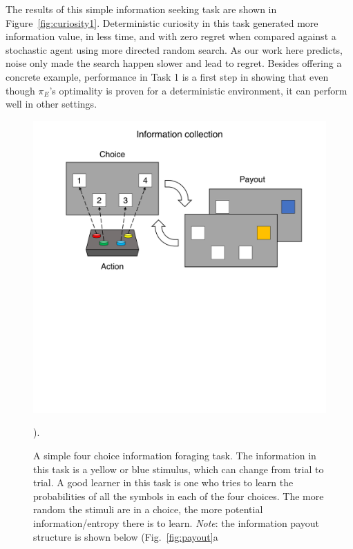The results of this simple information seeking task are shown in Figure~\ref{fig:curiosity1}. Deterministic curiosity in this task generated more information value, in less time, and with zero regret when compared against a stochastic agent using more directed random search. As our work here predicts, noise only made the search happen slower and lead to regret. Besides offering a concrete example, performance in Task 1 is a first step in showing that even though $\pi_E$'s optimality is proven for a deterministic environment, it can perform well in other settings.

\begin{figure}
	\begin{fullwidth}
	\includegraphics[width=1.0\linewidth]{img/task_outline1.pdf} 
	\caption{A simple four choice information foraging task. The information in this task is a yellow or blue stimulus, which can change from trial to trial. A good learner in this task is one who tries to learn the probabilities of all the symbols in each of the four choices. The more random the stimuli are in a choice, the more potential information/entropy there is to learn. \textit{Note}: the information payout structure is shown below (Fig.~\ref{fig:payout}a}).
	\label{fig:task_outline1} 
	\end{fullwidth}
\end{figure}

